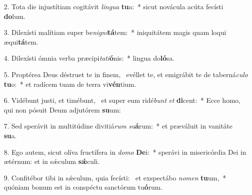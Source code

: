 2. Tota die injustítiam cogitávit \textit{lin}\textit{gua} \textbf{tu}a:~*  sicut novácula acúta fecísti \textbf{do}lum.\

3. Dilexísti malítiam super be\textit{ni}\textit{gni}\textbf{tá}tem:~*  iniquitátem magis quam loqui æqui\textbf{tá}tem.\

4. Dilexísti ómnia verba præcipi\textit{ta}\textit{ti}\textbf{ó}nis:~*  lingua do\textbf{ló}sa.\

5. Proptérea Deus déstruet te in finem, \dag\  evéllet te, et emigrábit te de taberná\textit{cu}\textit{lo} \textbf{tu}o:~*  et radícem tuam de terra vi\textbf{vén}tium.\

6. Vidébunt justi, et timébunt, \dag\  et super eum ridé\textit{bunt} \textit{et} \textbf{di}cent:~*  Ecce homo, qui non pósuit Deum adjutórem \textbf{su}um:\

7. Sed sperávit in multitúdine divitiá\textit{rum} \textit{su}\textbf{á}rum:~*  et præváluit in vanitáte \textbf{su}a.\

8. Ego autem, sicut olíva fructífera in \textit{do}\textit{mo} \textbf{De}i:~*  sperávi in misericórdia Dei in ætérnum: et in sǽculum \textbf{sǽ}culi.\

9. Confitébor tibi in sǽculum, quia fecísti: \dag\  et exspectábo \textit{no}\textit{men} \textbf{tu}um,~*  quóniam bonum est in conspéctu sanctórum tu\textbf{ó}rum.\


